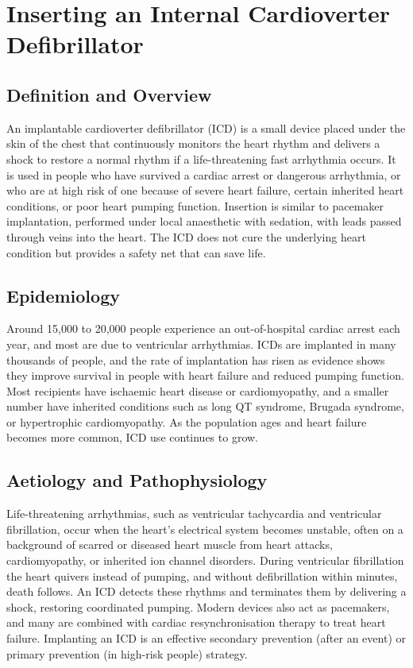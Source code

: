 \chapter{Inserting an Internal Cardioverter Defibrillator}

\section*{Definition and Overview}
An implantable cardioverter defibrillator (ICD) is a small device placed under the skin of the chest that continuously monitors the heart rhythm and delivers a shock to restore a normal rhythm if a life-threatening fast arrhythmia occurs. It is used in people who have survived a cardiac arrest or dangerous arrhythmia, or who are at high risk of one because of severe heart failure, certain inherited heart conditions, or poor heart pumping function. Insertion is similar to pacemaker implantation, performed under local anaesthetic with sedation, with leads passed through veins into the heart. The ICD does not cure the underlying heart condition but provides a safety net that can save life.

\section*{Epidemiology}
Around 15,000 to 20,000 people experience an out-of-hospital cardiac arrest each year, and most are due to ventricular arrhythmias. ICDs are implanted in many thousands of people, and the rate of implantation has risen as evidence shows they improve survival in people with heart failure and reduced pumping function. Most recipients have ischaemic heart disease or cardiomyopathy, and a smaller number have inherited conditions such as long QT syndrome, Brugada syndrome, or hypertrophic cardiomyopathy. As the population ages and heart failure becomes more common, ICD use continues to grow.

\section*{Aetiology and Pathophysiology}
Life-threatening arrhythmias, such as ventricular tachycardia and ventricular fibrillation, occur when the heart's electrical system becomes unstable, often on a background of scarred or diseased heart muscle from heart attacks, cardiomyopathy, or inherited ion channel disorders. During ventricular fibrillation the heart quivers instead of pumping, and without defibrillation within minutes, death follows. An ICD detects these rhythms and terminates them by delivering a shock, restoring coordinated pumping. Modern devices also act as pacemakers, and many are combined with cardiac resynchronisation therapy to treat heart failure. Implanting an ICD is an effective secondary prevention (after an event) or primary prevention (in high-risk people) strategy.

